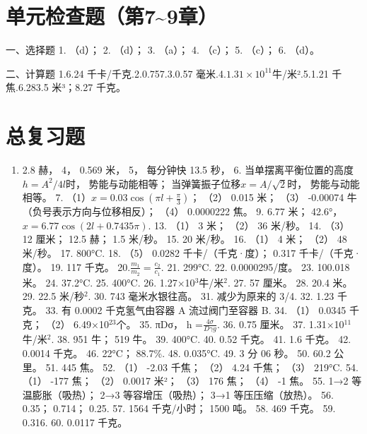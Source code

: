 \section{单元检查题（第7\textasciitilde9章）}\label{ux5355ux5143ux68c0ux67e5ux9898ux7b2c79ux7ae0}

一、选择题 1. （d）； 2. （d）； 3. （a）； 4. （c）； 5. （c）； 6.
（d）。

二、计算题 1.6.24 千卡/千克.2.0.757.3.0.57
毫米.4.\(1.31 \times 10^{11}\)牛/米².5.1.21 千焦.6.283.5 米³；8.27
千克。

\section{总复习题}\label{ux603bux590dux4e60ux9898-1}

\begin{enumerate}
\def\labelenumi{\arabic{enumi}.}
\setcounter{enumi}{1}
\tightlist
\item
  2.8 赫， 4， 0.569 米， 5， 每分钟快 13.5 秒， 6.
  当单摆离平衡位置的高度\(h = A^2 / 4l\)时， 势能与动能相等；
  当弹簧振子位移\(x = A / \sqrt{2}\)时， 势能与动能相等。 7.
  （1）\(x = 0.03 \cos \left( \pi l + \frac{\pi}{3} \right)\)； （2）
  0.015 米； （3） -0.00074 牛（负号表示方向与位移相反）； （4）
  0.0000222 焦。 9. 6.77 米； 42.6°，\(x = 6.77 \cos (2l + 0.7435\pi)\).
  13. （1） 3 米； （2） 36 米/秒。 14. （3） 12 厘米； 12.5 赫； 1.5
  米/秒。 15. 20 米/秒。 16. （1） 4 米； （2） 48 米/秒。 17. 800°C.
  18. （5） 0.0282 千卡/（千克·度）； 0.317 千卡/（千克·度）。 19. 117
  千克。 20.\(\frac{m_1}{m_2} = \frac{c_2}{c_1}\). 21. 299°C. 22.
  0.0000295/度。 23. 100.018 米。 24. 37.2°C. 25. 400°C. 26.
  1.27×10\(^3\)牛/米\(^2\). 27. 57 厘米。 28. 20.4 米。 29. 22.5
  米/秒\(^2\). 30. 743 毫米水银往高。 31. 减少为原来的 3/4. 32. 1.23
  千克。 33. 有 0.0002 千克氢气由容器 A 流过阀门至容器 B. 34. （1）
  0.0345 千克； （2） 6.49×10\(^{23}\)个。 35. πDσ， h
  =\(\frac{4\sigma}{D\gamma g}\). 36. 0.75 厘米。 37.
  1.31×10\(^{11}\)牛/米\(^{2}\). 38. 951 牛； 519 牛。 39. 400°C. 40.
  0.52 千克。 41. 1.6 千克。 42. 0.0014 千克。 46. 22°C； 88.7\%. 48.
  0.035°C. 49. 3 分 06 秒。 50. 60.2 公里。 51. 445 焦。 52. （1） -2.03
  千焦； （2） 4.24 千焦； （3） 219°C. 54. （1） -177 焦； （2） 0.0017
  米²； （3） 176 焦； （4） -1 焦。 55. 1→2 等温膨胀（吸热）； 2→3
  等容增压（吸热）； 3→1 等压压缩（放热）。 56. 0.35； 0.714； 0.25. 57.
  1564 千克/小时； 1500 吨。 58. 469 千克。 59. 0.316. 60. 0.0117 千克。
\end{enumerate}

